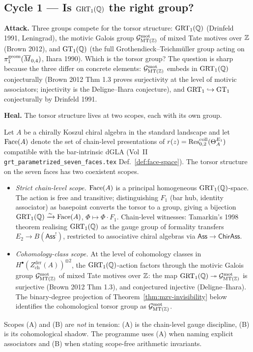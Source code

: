 \subsection*{Cycle 1 --- Is $\mathrm{GRT}_1(\mathbb{Q})$ the right group?}

\textbf{Attack.} Three groups compete for the torsor structure:
$\mathrm{GRT}_1(\mathbb{Q})$ (Drinfeld 1991, Leningrad), the motivic Galois group
$\mathcal{G}^{\mathrm{mot}}_{\mathrm{MT}(\mathbb{Z})}$ of mixed Tate motives over $\mathbb{Z}$ (Brown
2012), and $\mathrm{GT}_1(\mathbb{Q})$ (the full Grothendieck--Teichm\"uller group
acting on $\pi_1^{\mathrm{geom}}(\overline{M}_{0,4})$, Ihara 1990). Which is
the torsor group? The question is sharp because the three differ on
concrete elements: $\mathcal{G}^{\mathrm{mot}}_{\mathrm{MT}(\mathbb{Z})}$ embeds in $\mathrm{GRT}_1(\mathbb{Q})$
conjecturally (Brown 2012 Thm 1.3 proves surjectivity at the level of
motivic associators; injectivity is the Deligne--Ihara conjecture), and
$\mathrm{GRT}_1 \hookrightarrow \mathrm{GT}_1$ conjecturally by Drinfeld 1991.

\textbf{Heal.} The torsor structure lives at two scopes, each with its
own group.

\begin{theorem}\ClaimStatusScoped
\label{thm:grt-two-scope}
Let $A$ be a chirally Koszul chiral algebra in the standard landscape
and let $\mathrm{Face}(A)$ denote the set of chain-level presentations of
$r(z) = \operatorname{Res}^{\mathrm{coll}}_{0,2}(\Theta_A^{E_1})$ compatible with the
bar-intrinsic dGLA (Vol~II
\texttt{grt\_parametrized\_seven\_faces.tex} Def.~\ref{def:face-space}).
The torsor structure on the seven faces has two coexistent scopes.
\begin{itemize}
\item[(A)] \emph{Strict chain-level scope.} $\mathrm{Face}(A)$ is a principal
homogeneous $\mathrm{GRT}_1(\mathbb{Q})$-space. The action is free and transitive;
distinguishing $F_1$ (bar hub, identity associator) as basepoint
converts the torsor to a group, giving a bijection
$\mathrm{GRT}_1(\mathbb{Q}) \xrightarrow{\sim} \mathrm{Face}(A)$,
$\Phi \mapsto \Phi \cdot F_1$. Chain-level witnesses: Tamarkin's
1998 theorem realising $\mathrm{GRT}_1(\mathbb{Q})$ as the gauge group of formality
transfers $E_2 \to B(\mathsf{Ass}^!)$, restricted to associative
chiral algebras via $\mathsf{Ass} \to \mathsf{ChirAss}$.

\item[(B)] \emph{Cohomology-class scope.} At the level of cohomology
classes in $H^\bullet(Z^{\mathrm{der}}_{\mathrm{ch}}(A))^{\otimes 2}$,
the $\mathrm{GRT}_1(\mathbb{Q})$-action factors through the motivic Galois group
$\mathcal{G}^{\mathrm{mot}}_{\mathrm{MT}(\mathbb{Z})}$ of mixed Tate motives over $\mathbb{Z}$: the
map $\mathrm{GRT}_1(\mathbb{Q}) \twoheadrightarrow \mathcal{G}^{\mathrm{mot}}_{\mathrm{MT}(\mathbb{Z})}$ is
surjective (Brown 2012 Thm 1.3), and conjectured injective
(Deligne--Ihara). The binary-degree projection of
Theorem~\ref{thm:mzv-invisibility} below identifies the
cohomological torsor group as $\mathcal{G}^{\mathrm{mot}}_{\mathrm{MT}(\mathbb{Z})}$.
\end{itemize}
Scopes (A) and (B) are \emph{not} in tension: (A) is the chain-level
gauge discipline, (B) is its cohomological shadow. The programme uses
(A) when naming explicit associators and (B) when stating
scope-free arithmetic invariants.
\end{theorem}

